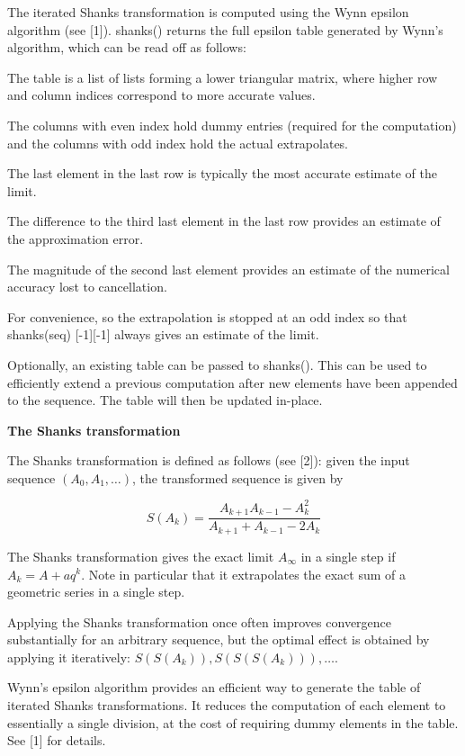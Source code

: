 \vpara
The iterated Shanks transformation is computed using the Wynn epsilon algorithm (see [1]). shanks() returns the full epsilon table generated by Wynn's algorithm, which can be read off as follows:

\vpara
The table is a list of lists forming a lower triangular matrix, where higher row and column indices correspond to more accurate values.

The columns with even index hold dummy entries (required for the computation) and the columns with odd index hold the actual extrapolates.

The last element in the last row is typically the most accurate estimate of the limit.

The difference to the third last element in the last row provides an estimate of the approximation error.

The magnitude of the second last element provides an estimate of the numerical accuracy lost to cancellation.

\vpara
For convenience, so the extrapolation is stopped at an odd index so that shanks(seq) [-1][-1] always gives an estimate of the limit.

\vpara
Optionally, an existing table can be passed to shanks(). This can be used to efficiently extend a previous computation after new elements have been appended to the sequence. The table will then be updated in-place.

\vpara
\textbf{The Shanks transformation}

The Shanks transformation is defined as follows (see [2]): given the input sequence $(A_0,A_1,\ldots)$, the transformed sequence is given by

\begin{equation}
S(A_k) = \frac{A_{k+1} A_{k-1} - A_k^2}{A_{k+1} + A_{k-1} - 2A_k}
\end{equation}

The Shanks transformation gives the exact limit $A_{\infty}$ in a single step if $A_k=A + aq^k$. Note in particular that it extrapolates the exact sum of a geometric series in a single step.

Applying the Shanks transformation once often improves convergence substantially for an arbitrary sequence, but the optimal effect is obtained by applying it iteratively: $S(S(A_k)),S(S(S(A_k))),\ldots$.

\vpara
Wynn’s epsilon algorithm provides an efficient way to generate the table of iterated Shanks transformations. It reduces the computation of each element to essentially a single division, at the cost of requiring dummy elements in the table. See [1] for details.

